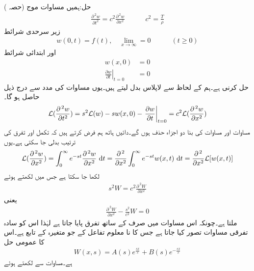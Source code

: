 حل:\quad ہمیں مساوات موج (حصہ )
\begin{align}\label{مساوات_نصف_لامتناہی_تار_مثال_الف}
\frac{\partial^{\,2}w}{\partial t^2}=c^2\frac{\partial^{\,2}w}{\partial x^2}\quad \quad \quad c^2=\frac{T}{\rho}
\end{align}
زیر سرحدی شرائط
\begin{align}\label{مساوات_نصف_لامتناہی_تار_مثال_ب}
w(0,t)=f(t),\quad \lim_{x\to\infty}=0\quad \quad \quad (t\ge 0)
\end{align}
اور ابتدائی شرائط 
\begin{align}
w(x,0)&=0\label{مساوات_نصف_لامتناہی_تار_مثال_پ}\\
\left.\frac{\partial w}{\partial t} \right|_{t=0}&=0\label{مساوات_نصف_لامتناہی_تار_مثال_ت}
\end{align}
 حل کرنی ہے۔ہم  کے لحاظ سے لاپلاس بدل لیتے ہیں۔یوں مساوات  کی مدد سے درج ذیل حاصل ہو گا۔
\begin{align*}
\mathcal{L}(\frac{\partial^{\,2}w}{\partial t^2})=s^2\mathcal{L}(w)-sw(x,0)-\left.\frac{\partial w}{\partial t}\right|_{t=0}=c^2\mathcal{L}(\frac{\partial^{\,2}w}{\partial x^2})
\end{align*}
مساوات  اور مساوات  کی بنا دو اجزاء حذف ہوں گے۔دائیں ہاتھ ہم فرض کرتے ہیں کہ تکمل اور تفرق کی ترتیب بدلی جا سکتی ہے۔یوں
\begin{align*}
\Laplace(\frac{\partial^{\,2}w}{\partial x^2})=\int_0^{\infty} e^{-st}\frac{\partial^{\,2}w}{\partial x^2}\,\dif t=\frac{\partial^{\,2}}{\partial x^2}\int_0^{\infty}e^{-st}w(x,t)\,\dif t=\frac{\partial^{\,2}}{\partial x^2}\Laplace[w(x,t)]
\end{align*}
لکھا جا سکتا ہے جس میں  لکھتے ہوئے
\begin{align*}
s^2W=c^2\frac{\partial^{\,2}W}{\partial x^2}
\end{align*}
یعنی
\begin{align*}
\frac{\partial^{\,2}W}{\partial x^2}-\frac{s^2}{c^2}W=0
\end{align*}
ملتا ہے۔چونکہ اس مساوات میں صرف  کے ساتھ تفرق پایا جاتا ہے لہٰذا اس کو سادہ تفرقی مساوات تصور کیا جاتا ہے جس کا نا معلوم تفاعل  کے جو متغیرہ  کے تابع ہے۔اس کا عمومی حل
\begin{align}\label{مساوات_نصف_لامتناہی_تار_مثال_ٹ}
W(x,s)=A(s)e^{\frac{sx}{c}}+B(s)e^{-\frac{sx}{c}}
\end{align}
ہے۔مساوات  سے  لکھتے ہوئے
